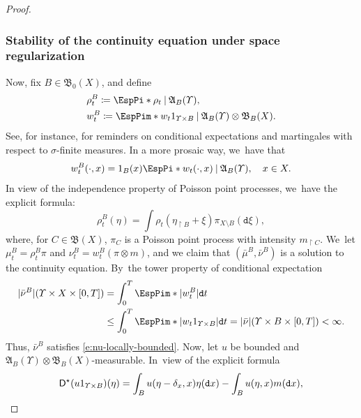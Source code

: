 \documentclass[10pt]{amsart}
\theoremstyle{definition}
\theoremstyle{remark}
\DeclarePairedDelimiter{\paren}{\lparen}{\rparen}
\DeclarePairedDelimiter{\abs}{\lvert}{\rvert}
\newcommand{\given}[1][]{%
\nonscript\:#1\vert
\allowbreak
\nonscript\:
\mathopen{}}
\begin{document}
\begin{proof}
\subsubsection*{Stability of the continuity equation under space regularization}
Now, fix $B \in \mathfrak{B}_{0}(X)$, and define
\begin{align*}
& \rho^{B}_{t} \coloneq \EspPi*{ \rho_{t} \given \mathfrak{A}_{B}(\varUpsilon) }, \\
& w^{B}_{t} \coloneq \EspPim*{ w_{t} 1_{\varUpsilon \times B} \given \mathfrak{A}_{B}(\varUpsilon) \otimes \mathfrak{B}_{B}(X) }.
\end{align*}
See, for instance, \cite[\S\S 39--43, pp.\,36--43]{DellacherieMeyerMartingales} for reminders on conditional expectations and martingales with respect to $\sigma$-finite measures.
In a more prosaic way, we~have that
\begin{equation}\label{e:w-conditional-x}
w^{B}_{t}(\cdot, x) = 1_{B}(x) \EspPi*{ w_{t}(\cdot, x) \given \mathfrak{A}_{B}(\varUpsilon) }, \quad x \in X.
\end{equation}
In view of the independence property of Poisson point processes, we~have the explicit formula:
\begin{equation*}
\rho^{B}_{t}(\eta) = \int \rho_{t}(\eta_{\restriction B} + \xi) \pi_{X \setminus B}(\mathtt{d} \xi),
\end{equation*}
where, for $C \in \mathfrak{B}(X)$, $\pi_{C}$ is a Poisson point process with intensity $m_{\restriction C}$. We~let $\mu_{t}^{B} = \rho_{t}^{B} \pi$ and $\nu_{t}^{B} = w_{t}^{B} (\pi \otimes m)$, and we claim that $(\bar{\mu}^{B}, \bar{\nu}^{B})$ is a solution to the continuity equation.
By~the tower property of conditional expectation
\begin{equation*}
\begin{split}
\abs{\bar{\nu}^{B}}(\varUpsilon \times X \times [0,T]) &= \int_{0}^{T} \EspPim*{ \abs{w_{t}^{B}} } \mathtt{d} t
\\& \leq \int_{0}^{T} \EspPim*{ \abs{w_{t} 1_{\varUpsilon \times B}} } \mathtt{d} t
= \abs{\bar{\nu}}(\varUpsilon \times B \times [0,T]) < \infty.
\end{split}
\end{equation*}
Thus, $\bar{\nu}^{B}$ satisfies \cref{e:nu-locally-bounded}.
Now, let $u$ be bounded and $\mathfrak{A}_{B}(\varUpsilon) \otimes \mathfrak{B}_{B}(X)$-measurable.
In~view of the explicit formula
\begin{equation*}
\mathsf{D}^{\star} \paren*{ u 1_{\varUpsilon \times B} }(\eta) = \int_{B} u(\eta - \delta_{x}, x) \eta(\mathtt{d} x) - \int_{B} u(\eta, x) m(\mathtt{d} x),

\end{equation*}
\end{proof}
\end{document}
